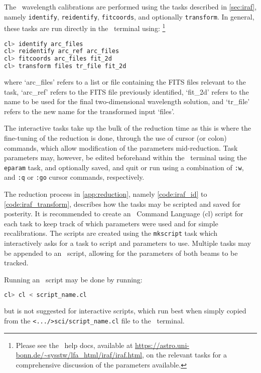 The \iraf\ wavelength calibrations are performed using the tasks described in \autoref{sec:iraf}, namely \texttt{identify}, \texttt{reidentify}, \texttt{fitcoords}, and optionally \texttt{transform}. In general, these tasks are run directly in the \iraf\ terminal using:%
\footnote{Please see the \iraf\ help docs, available at \url{https://astro.uni-bonn.de/~sysstw/lfa_html/iraf/iraf.html}, on the relevant tasks for a comprehensive discussion of the parameters available.}
\begin{lstlisting}[language=bash]
cl> identify arc_files
cl> reidentify arc_ref arc_files
cl> fitcoords arc_files fit_2d
cl> transform files tr_file fit_2d
\end{lstlisting}
{\parskip=0pt where} `arc\_files' refers to a list or file containing the \gls{FITS} files relevant to the task, `arc\_ref' refers to the \gls{FITS} file previously identified, `fit\_2d' refers to the name to be used for the final two-dimensional wavelength solution, and `tr\_file' refers to the new name for the transformed input `files'.

The interactive tasks take up the bulk of the reduction time as this is where the fine-tuning of the reduction is done, through the use of cursor (or colon) commands, which allow modification of the parameters mid-reduction. Task parameters may, however, be edited beforehand within the \iraf\ terminal using the \texttt{eparam} task, and optionally saved, and quit or run using a combination of \texttt{:w}, and \texttt{:q} or \texttt{:go} cursor commands, respectively.

The reduction process in \autoref{app:reduction}, namely \autoref{code:iraf_id} to \ref{code:iraf_transform}, describes how the tasks may be scripted and saved for posterity. It is recommended to create an \iraf\ Command Language (cl) script for each task to keep track of which parameters were used and for simple recalibrations. The scripts are created using the \texttt{mkscript} task which interactively asks for a task to script and parameters to use. Multiple tasks may be appended to an \iraf\ script, allowing for the parameters of both beams to be tracked.

\pagebreak

Running an \iraf\ script may be done by running:
\begin{lstlisting}[language=bash]
cl> cl < script_name.cl
\end{lstlisting}
{\parskip=0pt but} is not suggested for interactive scripts, which run best when simply copied from the \texttt{<.../>sci/script\_name.cl} file to the \iraf\ terminal.


